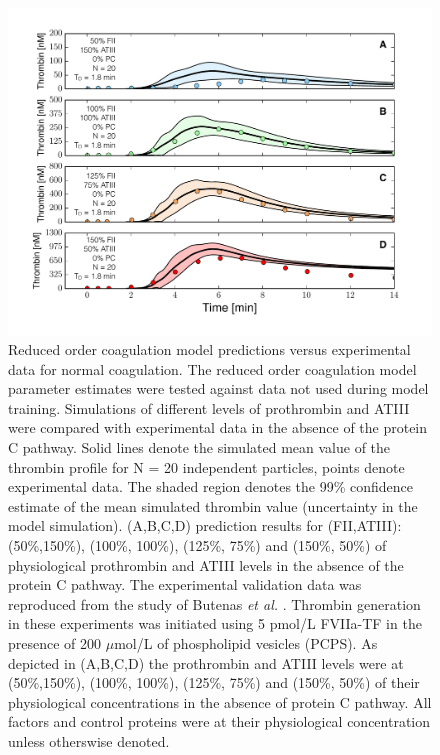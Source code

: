 \documentclass[processes,article,received,moreauthors,pdftex,12pt,a4paper]{mdpi}
\begin{document}
\begin{figure}[H]
\centering
\includegraphics[width=1.0\textwidth]{./figs/Figure-5-FII_ATIII.pdf}
\caption{Reduced order coagulation model predictions versus experimental data for normal coagulation. 
The reduced order coagulation model parameter estimates were tested against data not used during model training.
Simulations of different levels of prothrombin and ATIII were compared with experimental data in the absence of the protein C pathway. 
Solid lines denote the simulated mean value of the thrombin profile for N = 20 independent particles, points denote experimental data.
The shaded region denotes the 99\% confidence estimate of the mean simulated thrombin value (uncertainty in the model simulation). 
(A,B,C,D) prediction results for (FII,ATIII): (50\%,150\%), (100\%, 100\%), (125\%, 75\%) and (150\%, 50\%) of physiological prothrombin and ATIII levels in the absence of the protein C pathway. The experimental validation data was reproduced from the study of Butenas \textit{et al.} \citep{Butenas:1999aa}.
Thrombin generation in these experiments was initiated using 5 pmol/L FVIIa-TF in the presence of 200 $\mu$mol/L of phospholipid vesicles (PCPS). 
As depicted in (A,B,C,D) the prothrombin and ATIII levels were at (50\%,150\%), (100\%, 100\%), (125\%, 75\%) and (150\%, 50\%) of their physiological concentrations in the absence of protein C pathway. All factors and control proteins were at their physiological concentration unless otherswise denoted.}\label{fig-fII_ATIII}
\end{figure}
\end{document}
